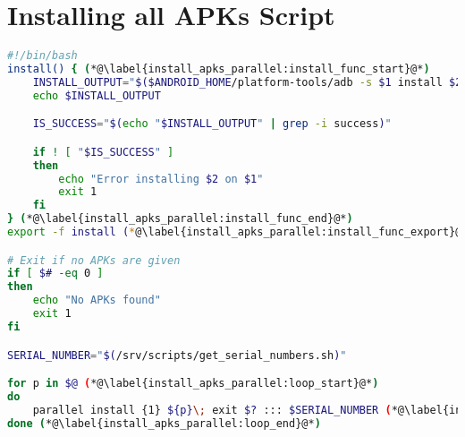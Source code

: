 \chapter{Installing all APKs Script}\label{app:install_apks}
\begin{lstlisting}[language=bash,caption=Script that install APKs on all connected devices in parallel,label=lst:install_apks_parallel]
#!/bin/bash
install() { (*@\label{install_apks_parallel:install_func_start}@*)
    INSTALL_OUTPUT="$($ANDROID_HOME/platform-tools/adb -s $1 install $2)"
    echo $INSTALL_OUTPUT

    IS_SUCCESS="$(echo "$INSTALL_OUTPUT" | grep -i success)"

    if ! [ "$IS_SUCCESS" ]
    then
        echo "Error installing $2 on $1"
        exit 1
    fi
} (*@\label{install_apks_parallel:install_func_end}@*)
export -f install (*@\label{install_apks_parallel:install_func_export}@*)

# Exit if no APKs are given
if [ $# -eq 0 ]
then
    echo "No APKs found"
    exit 1
fi

SERIAL_NUMBER="$(/srv/scripts/get_serial_numbers.sh)"

for p in $@ (*@\label{install_apks_parallel:loop_start}@*)
do
    parallel install {1} ${p}\; exit $? ::: $SERIAL_NUMBER (*@\label{install_apks_parallel:parallel_loop}@*)
done (*@\label{install_apks_parallel:loop_end}@*)
\end{lstlisting}